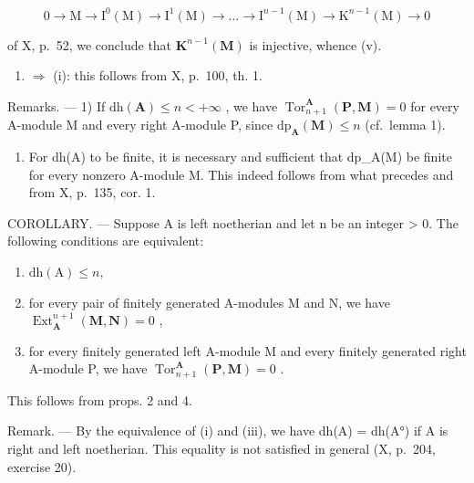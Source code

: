 \[
0 \rightarrow \mathrm{M} \rightarrow \mathrm{I} ^ {0} (\mathrm{M}) \rightarrow \mathrm{I} ^ {1} (\mathrm{M}) \rightarrow \dots \rightarrow \mathrm{I} ^ {n - 1} (\mathrm{M}) \rightarrow \mathrm{K} ^ {n - 1} (\mathrm{M}) \rightarrow 0
\]

of X, p.~52, we conclude that \(\mathbf{K}^{n-1}(\mathbf{M})\) is injective, whence (v).

\begin{enumerate}
\def\labelenumi{(\alph{enumi})}
\setcounter{enumi}{21}
\tightlist
\item
  \(\Rightarrow\) (i): this follows from X, p.~100, th. 1.
\end{enumerate}

Remarks. --- 1) If \(\mathrm{dh}(\mathbf{A}) \leqslant n < +\infty\) , we have \(\operatorname{Tor}_{n+1}^{\mathbf{A}}(\mathbf{P}, \mathbf{M}) = 0\) for every A-module M and every right A-module P, since \(\mathrm{dp}_{\mathbf{A}}(\mathbf{M}) \leqslant n\) (cf.~lemma 1).

\begin{enumerate}
\def\labelenumi{\arabic{enumi})}
\setcounter{enumi}{1}
\tightlist
\item
  For dh(A) to be finite, it is necessary and sufficient that dp\_A(M) be finite for every nonzero A-module M. This indeed follows from what precedes and from X, p.~135, cor. 1.
\end{enumerate}

COROLLARY. --- Suppose A is left noetherian and let n be an integer \textgreater{} 0. The following conditions are equivalent:

\begin{enumerate}
\def\labelenumi{(\roman{enumi})}
\item
  \(\mathrm{dh(A)}\leqslant n,\)
\item
  for every pair of finitely generated A-modules M and N, we have \(\operatorname{Ext}_{\mathbf{A}}^{n+1}(\mathbf{M}, \mathbf{N}) = 0\) ,
\item
  for every finitely generated left A-module M and every finitely generated right A-module P, we have \(\operatorname{Tor}_{n+1}^{\mathbf{A}}(\mathbf{P},\mathbf{M}) = 0\) .
\end{enumerate}

This follows from props. 2 and 4.

Remark. --- By the equivalence of (i) and (iii), we have dh(A) = dh(A°) if A is right and left noetherian. This equality is not satisfied in general (X, p.~204, exercise 20).

